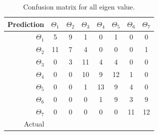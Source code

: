 \documentclass[runningheads,a4paper]{llncs}
\begin{document}
\begin{table}
\centering
\caption{Confusion matrix for all eigen value.}
\label{tab:confall}
\begin{tabular}{@{}r|ccccccc@{}}
\toprule
Prediction & \multicolumn{1}{r}{$\Theta_1$} & \multicolumn{1}{r}{$\Theta_2$} & \multicolumn{1}{r}{$\Theta_3$} & \multicolumn{1}{r}{$\Theta_4$} & \multicolumn{1}{r}{$\Theta_5$} & \multicolumn{1}{r}{$\Theta_6$} & \multicolumn{1}{r}{$\Theta_7$} \\ \midrule
$\Theta_1$ & 5                              & 9                              & 1                              & 0                              & 1                              & 0                              & 0                              \\
$\Theta_2$ & 11                             & 7                              & 4                              & 0                              & 0                              & 0                              & 1                              \\
$\Theta_3$ & 0                              & 3                              & 11                             & 4                              & 4                              & 0                              & 0                              \\
$\Theta_4$ & 0                              & 0                              & 10                             & 9                              & 12                             & 1                              & 0                              \\
$\Theta_5$ & 0                              & 0                              & 1                              & 13                             & 9                              & 4                              & 0                              \\
$\Theta_6$ & 0                              & 0                              & 0                              & 1                              & 9                              & 3                              & 9                              \\
$\Theta_7$ & 0                              & 0                              & 0                              & 0                              & 0                              & 11                             & 12                             \\ \midrule
Actual     & \multicolumn{1}{l}{}           & \multicolumn{1}{l}{}           & \multicolumn{1}{l}{}           & \multicolumn{1}{l}{}           & \multicolumn{1}{l}{}           & \multicolumn{1}{l}{}           & \multicolumn{1}{l}{}           \\ \cmidrule(r){1-1}
\end{tabular}
\end{table}
\end{document}
